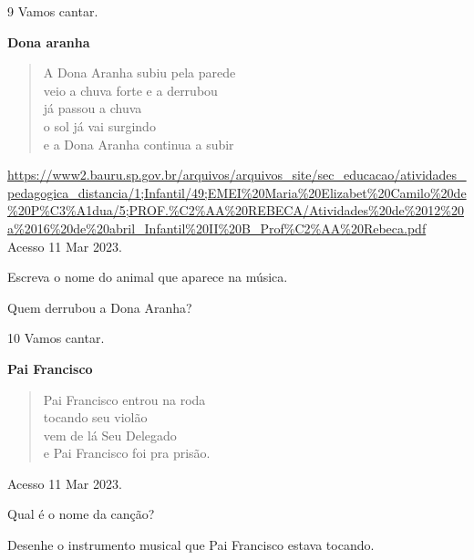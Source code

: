 {{{\num{9} Vamos cantar.

\textbf{Dona aranha}

\begin{verse}
A Dona Aranha subiu pela parede\\
veio a chuva forte e a derrubou\\
já passou a chuva\\
o sol já vai surgindo\\
e a Dona Aranha continua a subir
\end{verse}

\url{https://www2.bauru.sp.gov.br/arquivos/arquivos_site/sec_educacao/atividades_pedagogica_distancia/1;Infantil/49;EMEI\%20Maria\%20Elizabet\%20Camilo\%20de\%20P\%C3\%A1dua/5;PROF.\%C2\%AA\%20REBECA/Atividades\%20de\%2012\%20a\%2016\%20de\%20abril_Infantil\%20II\%20B_Prof\%C2\%AA\%20Rebeca.pdf}
Acesso 11 Mar 2023.

\begin{escolha}
	\item Escreva o nome do animal que aparece na música.


	\item Quem derrubou a Dona Aranha?


\end{escolha}

\num{10} Vamos cantar.

\textbf{Pai Francisco}

\begin{verse}
Pai Francisco entrou na roda\\
tocando seu violão\\
vem de lá Seu Delegado\\
e Pai Francisco foi pra prisão.
\end{verse}

Acesso 11 Mar 2023.

\begin{escolha}
	\item Qual é o nome da canção?

	\item Desenhe o instrumento musical que Pai Francisco estava tocando.


\end{escolha}}}}
